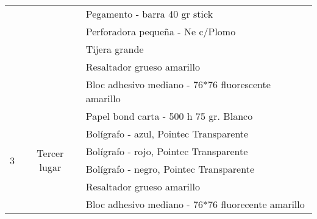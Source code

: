 \documentclass{article}
\begin{document}
\begin{table}[htbp]
{\begin{tabular}{|c|c|l|}
\cmidrule{3-3}          &       & Pegamento - barra 40 gr stick \\
\cmidrule{3-3}          &       & Perforadora pequeña - Ne c/Plomo \\
\cmidrule{3-3}          &       & Tijera grande \\
\cmidrule{3-3}          &       & Resaltador grueso amarillo \\
\cmidrule{3-3}          &       & Bloc adhesivo mediano - 76*76 fluorescente amarillo \\
    \midrule
    \multirow{6}[12]{*}{3} & \multirow{6}[12]{*}{Tercer lugar} & Papel bond carta - 500 h 75 gr. Blanco \\
\cmidrule{3-3}          &       & Bolígrafo - azul, Pointec Transparente \\
\cmidrule{3-3}          &       & Bolígrafo - rojo, Pointec Transparente \\
\cmidrule{3-3}          &       & Bolígrafo - negro, Pointec Transparente \\
\cmidrule{3-3}          &       & Resaltador grueso amarillo \\
\cmidrule{3-3}          &       & Bloc adhesivo mediano - 76*76 fluorecente amarillo \\
    \bottomrule
    \end{tabular}}%
  \label{tab:addlabel}%
\end{table}



%


%
\end{document}
